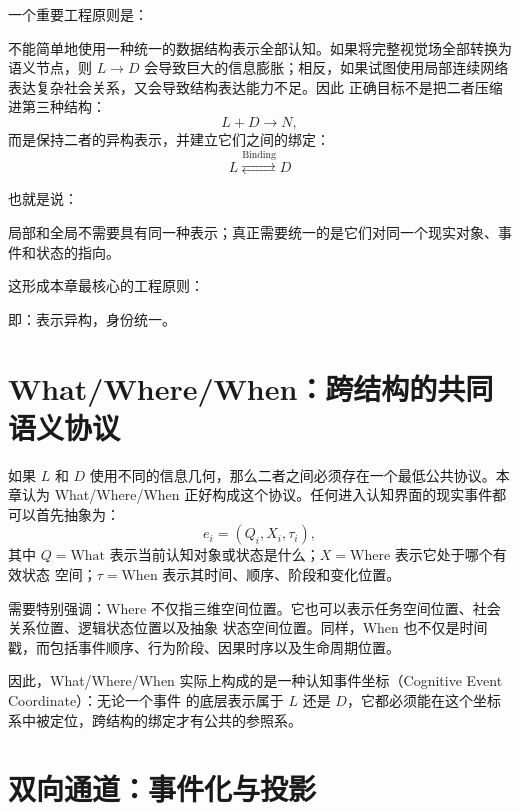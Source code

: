 一个重要工程原则是：

\begin{statementbox}
\centering
{}
\end{statementbox}

不能简单地使用一种统一的数据结构表示全部认知。如果将完整视觉场全部转换为语义节点，则 $L\rightarrow D$
会导致巨大的信息膨胀；相反，如果试图使用局部连续网络表达复杂社会关系，又会导致结构表达能力不足。因此
正确目标不是把二者压缩进第三种结构：
\[
L+D\rightarrow N,
\]
而是保持二者的异构表示，并建立它们之间的绑定：
\[
\boxed{
L
\overset{\mathrm{Binding}}{\rightleftarrows}
D
}
\]

也就是说：

\begin{statementbox}
局部和全局不需要具有同一种表示；真正需要统一的是它们对同一个现实对象、事件和状态的指向。
\end{statementbox}

这形成本章最核心的工程原则：

\begin{statementbox}
\centering
{}
\end{statementbox}

即：表示异构，身份统一。

\section{What/Where/When：跨结构的共同语义协议}

如果 $L$ 和 $D$ 使用不同的信息几何，那么二者之间必须存在一个最低公共协议。本章认为
What/Where/When 正好构成这个协议。任何进入认知界面的现实事件都可以首先抽象为：
\[
e_i=(Q_i,X_i,\tau_i),
\]
其中 $Q=\mathrm{What}$ 表示当前认知对象或状态是什么；$X=\mathrm{Where}$ 表示它处于哪个有效状态
空间；$\tau=\mathrm{When}$ 表示其时间、顺序、阶段和变化位置。

需要特别强调：Where 不仅指三维空间位置。它也可以表示任务空间位置、社会关系位置、逻辑状态位置以及抽象
状态空间位置。同样，When 也不仅是时间戳，而包括事件顺序、行为阶段、因果时序以及生命周期位置。

因此，What/Where/When 实际上构成的是一种认知事件坐标（Cognitive Event Coordinate）：无论一个事件
的底层表示属于 $L$ 还是 $D$，它都必须能在这个坐标系中被定位，跨结构的绑定才有公共的参照系。

\section{双向通道：事件化与投影}

